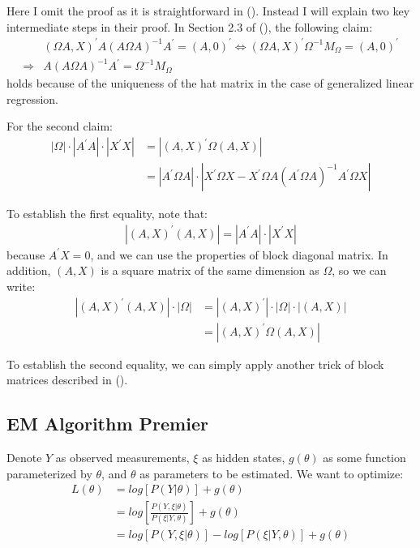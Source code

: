 \documentclass[10pt, titlepage]{article}
\numberwithin{equation}{section}
\begin{document}
Here I omit the proof as it is straightforward in (\cite{francke2010likelihood}). Instead I will explain two key intermediate steps in their proof. In Section 2.3 of (\cite{francke2010likelihood}), the following claim:
\begin{align*}
    &(\Omega A,X)^{'}A(A\Omega A)^{-1}A^{'}=(A,0)^{'} \Leftrightarrow (\Omega A,X)^{'}\Omega^{-1}M_{\Omega} = (A,0)^{'} \\
    \Rightarrow&A(A\Omega A)^{-1}A^{'}=\Omega^{-1}M_{\Omega}
\end{align*}
holds because of the uniqueness of the hat matrix in the case of generalized linear regression. 

For the second claim:
\begin{align*}
    |\Omega|\cdot|A^{'}A|\cdot|X^{'}X| &= |(A,X)^{'}\Omega(A,X)| \\
    &=|A^{'}\Omega A|\cdot|X^{'}\Omega X - X^{'}\Omega A(A^{'}\Omega A)^{-1}A^{'}\Omega X|
\end{align*}

To establish the first equality, note that:
\begin{align*}
    |(A,X)^{'}(A,X)| = |A^{'}A|\cdot|X^{'}X|
\end{align*}
because $A^{'}X=0$, and we can use the properties of block diagonal matrix. In addition, $(A,X)$ is a square matrix of the same dimension as $\Omega$, so we can write:
\begin{align*}
    |(A,X)^{'}(A,X)|\cdot|\Omega| &= |(A,X)^{'}|\cdot|\Omega|\cdot|(A,X)| \\
    &=|(A,X)^{'}\Omega(A,X)|
\end{align*}

To establish the second equality, we can simply apply another trick of block matrices described in (\cite{petersen2008matrix}).

\subsection{EM Algorithm Premier} \label{ap:EM_proof}
Denote $Y$ as observed measurements, $\xi$ as hidden states, $g(\theta)$ as some function parameterized by $\theta$, and $\theta$ as parameters to be estimated. We want to optimize:
\begin{align}
    L(\theta) & = log[P(Y|\theta)] + g(\theta) \nonumber \\
    & = log\left[\frac{P(Y,\xi|\theta)}{P(\xi|Y,\theta)}\right] +g(\theta) \nonumber \\
    & = log[P(Y,\xi|\theta)] - log[P(\xi|Y,\theta)] +g(\theta) \label{eq:general_mle}
\end{align}
\end{document}
